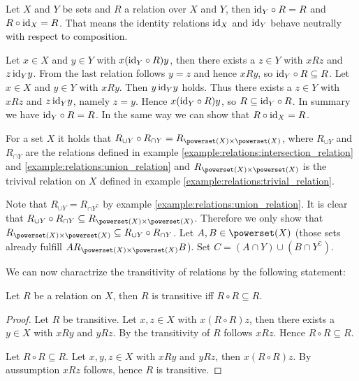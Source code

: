\begin{examples}
    \begin{exampleenumerate}
        \item\label{example:relations:composition_identity} Let $X$ and $Y$ be sets and $R$ a relation over $X$ and $Y$, then $\text{id}_Y\circ R=R$ and $R\circ\text{id}_X=R$. That means the identity relations $\text{id}_X$ and $\text{id}_Y$ behave neutrally with respect to composition.
        \begin{miniproof}
            \proofsubset Let $x\in X$ and $y\in Y$ with $x (\text{id}_Y\circ R) y$, then there exists a $z\in Y$ with $x R z$ and $z\,\text{id}_Y y$. From the last relation follows $y=z$ and hence $x R y$, so $\text{id}_Y\circ R\subseteq R$.
            \proofsupset Let $x\in X$ and $y\in Y$ with $x R y$. Then $y\,\text{id}_Y y$ holds. Thus there exists a $z\in Y$ with $x R z$ and $z\,\text{id}_Y y$, namely $z=y$. Hence $x(\text{id}_Y\circ R) y$, so $R\subseteq \text{id}_Y\circ R$.
            In summary we have $\text{id}_Y\circ R=R$. In the same way we can show that $R\circ\text{id}_X=R$.
        \end{miniproof}
        \item For a set $X$ it holds that $R_{\cup Y}\circ R_{\cap Y}=R_{\powerset(X)\times \powerset(X)}$, where $R_{\cup Y}$ and $R_{\cap Y}$ are the relations defined in example \ref{example:relations:intersection_relation} and \ref{example:relations:union_relation} and $R_{\powerset(X)\times \powerset(X)}$ is the trivival relation on $X$ defined in example \ref{example:relations:trivial_relation}.
        \begin{miniproof}
            Note that $R_{\cup Y}=R_{\cap Y^\complement}$ by example \ref{example:relations:union_relation}. It is clear that $R_{\cup Y}\circ R_{\cap Y}\subseteq R_{\powerset(X)\times \powerset(X)}$. Therefore we only show that $R_{\powerset(X)\times \powerset(X)}\subseteq R_{\cup Y}\circ R_{\cap Y}$. Let $A,B\in\powerset(X)$ (those sets already fulfill $A R_{\powerset(X)\times\powerset(X)} B$). Set $C=(A\cap Y)\cup (B\cap Y^\complement)$.
        \end{miniproof}
    \end{exampleenumerate}
\end{examples}

We can now charactrize the transitivity of relations by the following statement:

\begin{theorem}\label{theorem:relations:transitive_composition} 
    Let $R$ be a relation on $X$, then $R$ is transitive iff $R\circ R\subseteq R$.
\end{theorem}
\begin{proof}
    \proofright Let $R$ be transitive. Let $x,z\in X$ with $x(R\circ R)z$, then there exists a $y\in X$ with $x R y$ and $y R z$. By the  transitivity of $R$ follows $x R z$. Hence $R\circ R\subseteq R$.
    
    \proofleft Let $R\circ R\subseteq R$. Let $x,y,z\in X$ with $x R y$ and $y R z$, then $x(R\circ R)z$. By aussumption $x R z$ follows, hence $R$ is transitive.
\end{proof}

